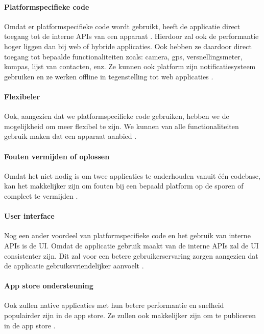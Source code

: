 \paragraph{Platformspecifieke code}
Omdat er platformspecifieke code wordt gebruikt, heeft de applicatie direct toegang tot 
de interne APIs van een apparaat \autocite{AWS2023}. Hierdoor zal ook de performantie hoger 
liggen dan bij web of hybride applicaties. Ook hebben ze daardoor direct toegang tot bepaalde 
functionaliteiten zoals: camera, gps, versnellingsmeter, kompas, lijst van contacten, enz. 
Ze kunnen ook platform zijn notificatiesysteem gebruiken en ze werken offline in tegenstelling 
tot web applicaties \autocite{Budiu2016}. 

\paragraph{Flexibeler}
Ook, aangezien dat we platformspecifieke code gebruiken, hebben we de mogelijkheid om meer flexibel te zijn. 
We kunnen van alle functionaliteiten gebruik maken dat een apparaat aanbied \autocite{Sakovich2023}.

\paragraph{Fouten vermijden of oplossen}
Omdat het niet nodig is om twee applicaties te onderhouden vanuit één \Gls{codebase}, kan 
het makkelijker zijn om fouten bij een bepaald platform op de sporen of compleet te 
vermijden \autocite{Koffer2023}. 

\paragraph{User interface}
Nog een ander voordeel van platformspecifieke code en het gebruik van interne APIs is de UI. 
Omdat de applicatie gebruik maakt van de interne APIs zal de UI consistenter zijn. 
Dit zal voor een betere gebruikerservaring zorgen aangezien dat de applicatie gebruiksvriendelijker 
aanvoelt \autocite{Kotlin2023}. 

\paragraph{App store ondersteuning}
Ook zullen native applicaties met hun betere performantie en snelheid populairder zijn in de app store. 
Ze zullen ook makkelijker zijn om te publiceren in de app store \autocite{Koffer2023}.

